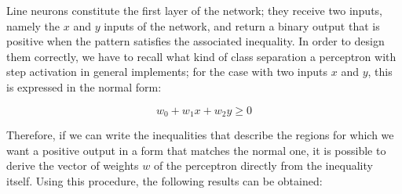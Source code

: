 \documentclass[letterpaper,headings=standardclasses]{scrartcl}
\begin{document}
Line neurons constitute the first layer of the network; they receive two inputs, namely the $x$ and $y$ inputs of the network, and return a binary output that is positive when the pattern satisfies the associated inequality. In order to design them correctly, we have to recall what kind of class separation a perceptron with step activation in general implements; for the case with two inputs $x$ and $y$, this is expressed in the normal form:

$$ w_0 + w_1x + w_2y \ge 0 $$

Therefore, if we can write the inequalities that describe the regions for which we want a positive output in a form that matches the normal one, it is possible to derive the vector of weights $w$ of the perceptron directly from the inequality itself. Using this procedure, the following results can be obtained:
\end{document}
